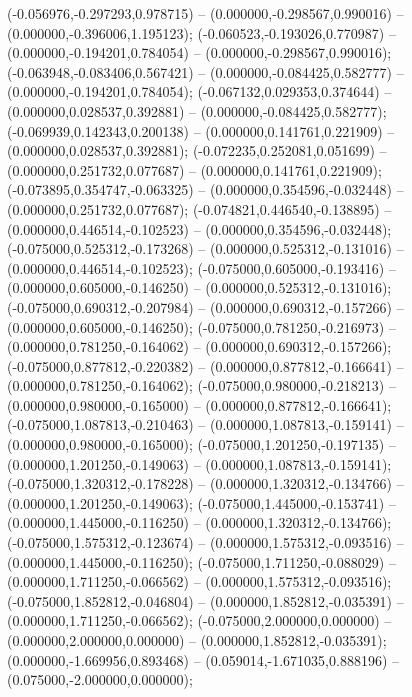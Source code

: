  (-0.056976,-0.297293,0.978715) -- (0.000000,-0.298567,0.990016) -- (0.000000,-0.396006,1.195123);
 (-0.060523,-0.193026,0.770987) -- (0.000000,-0.194201,0.784054) -- (0.000000,-0.298567,0.990016);
 (-0.063948,-0.083406,0.567421) -- (0.000000,-0.084425,0.582777) -- (0.000000,-0.194201,0.784054);
 (-0.067132,0.029353,0.374644) -- (0.000000,0.028537,0.392881) -- (0.000000,-0.084425,0.582777);
 (-0.069939,0.142343,0.200138) -- (0.000000,0.141761,0.221909) -- (0.000000,0.028537,0.392881);
 (-0.072235,0.252081,0.051699) -- (0.000000,0.251732,0.077687) -- (0.000000,0.141761,0.221909);
 (-0.073895,0.354747,-0.063325) -- (0.000000,0.354596,-0.032448) -- (0.000000,0.251732,0.077687);
 (-0.074821,0.446540,-0.138895) -- (0.000000,0.446514,-0.102523) -- (0.000000,0.354596,-0.032448);
 (-0.075000,0.525312,-0.173268) -- (0.000000,0.525312,-0.131016) -- (0.000000,0.446514,-0.102523);
 (-0.075000,0.605000,-0.193416) -- (0.000000,0.605000,-0.146250) -- (0.000000,0.525312,-0.131016);
 (-0.075000,0.690312,-0.207984) -- (0.000000,0.690312,-0.157266) -- (0.000000,0.605000,-0.146250);
 (-0.075000,0.781250,-0.216973) -- (0.000000,0.781250,-0.164062) -- (0.000000,0.690312,-0.157266);
 (-0.075000,0.877812,-0.220382) -- (0.000000,0.877812,-0.166641) -- (0.000000,0.781250,-0.164062);
 (-0.075000,0.980000,-0.218213) -- (0.000000,0.980000,-0.165000) -- (0.000000,0.877812,-0.166641);
 (-0.075000,1.087813,-0.210463) -- (0.000000,1.087813,-0.159141) -- (0.000000,0.980000,-0.165000);
 (-0.075000,1.201250,-0.197135) -- (0.000000,1.201250,-0.149063) -- (0.000000,1.087813,-0.159141);
 (-0.075000,1.320312,-0.178228) -- (0.000000,1.320312,-0.134766) -- (0.000000,1.201250,-0.149063);
 (-0.075000,1.445000,-0.153741) -- (0.000000,1.445000,-0.116250) -- (0.000000,1.320312,-0.134766);
 (-0.075000,1.575312,-0.123674) -- (0.000000,1.575312,-0.093516) -- (0.000000,1.445000,-0.116250);
 (-0.075000,1.711250,-0.088029) -- (0.000000,1.711250,-0.066562) -- (0.000000,1.575312,-0.093516);
 (-0.075000,1.852812,-0.046804) -- (0.000000,1.852812,-0.035391) -- (0.000000,1.711250,-0.066562);
 (-0.075000,2.000000,0.000000) -- (0.000000,2.000000,0.000000) -- (0.000000,1.852812,-0.035391);
 (0.000000,-1.669956,0.893468) -- (0.059014,-1.671035,0.888196) -- (0.075000,-2.000000,0.000000);
